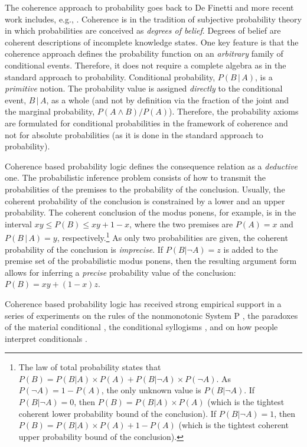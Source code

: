 \documentclass[11pt]{article}
\begin{document}
The coherence approach to probability goes back to De Finetti
\citeyear{deFinetti37,deFinetti74} and more recent work includes, e.g., 
. Coherence is in the
tradition of subjective probability theory in which probabilities are
conceived as {\em degrees of belief}. Degrees of belief are coherent
descriptions of incomplete knowledge states. One key feature is that
the coherence approach defines the probability function on an
\emph{arbitrary} family of conditional events. Therefore, it does not
require a complete algebra as in the standard approach to
probability. Conditional probability, $P(B\,|\,A)$, is a {\em
  primitive} notion. The probability value is assigned {\em directly}
to the conditional event, $B\,|\,A$, as a whole (and not by definition
via the fraction of the joint and the marginal probability, $P(A\wedge
B)/P(A)$). Therefore, the probability axioms are formulated for
conditional probabilities in the framework of coherence and not for
absolute probabilities (as it is done in the standard approach to
probability).

Coherence based probability logic defines the consequence relation as
a {\em deductive} one. The probabilistic inference problem consists of
how to transmit the probabilities of the premises to the probability
of the conclusion. Usually, the coherent probability of the conclusion
is constrained by a lower and an upper probability. The coherent
conclusion of the modus ponens, for example, is in the interval $xy
\leq P(B) \leq xy+1-x$, where the two premises are $P(A)=x$ and
$P(B\,|\,A)=y$, respectively.\footnote{The law of total probability
  states that $P(B)=P(B|A)\times P(A) + P(B|\neg A)\times P(\neg
  A)$. As $P(\neg A)=1-P(A)$, the only unknown value is $P(B|\neg
  A)$. If $P(B|\neg A)=0$, then $P(B)=P(B|A)\times P(A)$ (which is the
  tightest coherent lower probability bound of the conclusion). If
  $P(B|\neg A)=1$, then $P(B)=P(B|A)\times P(A) + 1-P(A)$ (which is
  the tightest coherent upper probability bound of the conclusion).}
As only two probabilities are given, the coherent probability of the
conclusion is {\em imprecise}. If $P(B|\neg A)=z$ is added to the
premise set of the probabilistic modus ponens, then the resulting argument
form allows for inferring a {\em precise} probability value of the
conclusion: $P(B)=xy + (1-x)z$.

Coherence based probability logic \cite{pfeifer06d,pfeifer09b} has
received strong empirical support in a series of experiments on the
rules of the nonmonotonic System P
\cite{pfeifer03,pfeifer,pfeifer06c}, the paradoxes of the material
conditional \cite{pfeifer10b}, the conditional syllogisms
\cite{pfeifer07a}, and on how people interpret conditionals
\cite{fugardip,fugard11}.
\end{document}
